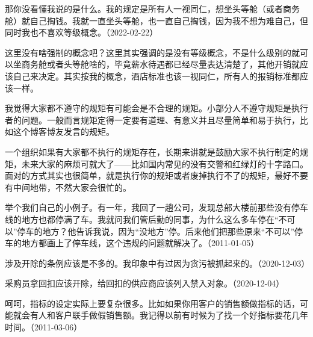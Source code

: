 那你没看懂我说的是什么。我的规定是所有人一视同仁，想坐头等舱（或者商务舱）就自己掏钱。我就一直坐头等舱，也一直自己掏钱，因为我不想为难自己，但同时我也不喜欢等级概念。（2022-02-22）


这里没有啥强制的概念吧？这里其实强调的是没有等级概念，不是什么级别的就可以坐商务舱或者头等舱啥的，毕竟薪水待遇都已经尽量表达清楚了，其他开销就应该自己来决定。其实按我的概念，酒店标准也该一视同仁，所有人的报销标准都应该一样。


我觉得大家都不遵守的规矩有可能会是不合理的规矩。小部分人不遵守规矩是执行者的问题。一般而言规矩定得一定要有道理、有意义并且尽量简单和易于执行，比如这个博客博友发言的规矩。

一个组织如果有大家都不执行的规矩存在，长期来讲就是鼓励大家不执行制定的规矩，未来大家的麻烦可就大了——比如国内常见的没有交警和红绿灯的十字路口。面对的方式其实也很简单，就是执行你的规矩或者废掉执行不了的规矩，最好不要有中间地带，不然大家会很忙的。

举个我们自己的小例子。有一年，我回了一趟公司，发现总部大楼前那些没有停车线的地方也都停满了车。我就问我们管后勤的同事，为什么这么多车停在“不可以”停车的地方？他告诉我说，因为“没地方”停。后来他们把那些原来“不可以”停车的地方都画上了停车线，这个违规的问题就解决了。（2011-01-05）


涉及开除的条例应该是不多的。我印象中有过因为贪污被抓起来的。（2020-12-03）


采购员拿回扣应该开除，给回扣的供应商应该列入禁入对象。（2020-12-04）


呵呵，指标的设定实际上要复杂很多。比如如果你用客户的销售额做指标的话，可能就会有人和客户联手做假销售额。我记得以前有时候为了找一个好指标要花几年时间。（2011-03-06）


